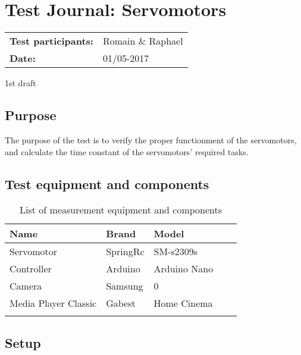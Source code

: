 \graphicspath{{figures/design/}}


			\chapter{Test Journal: Servomotors}



\begin{table}[!h]
\begin{tabular}{l l}
\textbf{Test participants:} & Romain \& Raphael   \\
\textbf{Date:}  & 01/05-2017
\end{tabular}
\end{table}

			1st draft


	\section*{Purpose}
	
The purpose of the test is to verify the proper functionment of the servomotors, and calculate the time constant of the servomotors' required tasks.




	\section*{Test equipment and components}
	
\begin{table}[h]
	\centering
	\caption{List of measurement equipment and components}\label{tab_appendix:template}

	\begin{tabularx}{\textwidth}{lXXXX}
		Name & Brand & Model 		\\ \toprule
		\rowcolor{lightGrey}
		Servomotor	& SpringRc & SM-s2309s 	\\
		Controller	& Arduino & Arduino Nano\\ 
		Camera & Samsung & 0\\
		Media Player Classic & Gabest & Home Cinema\\ \rowcolor{lightGrey}
	\end{tabularx}
\end{table}




	\section*{Setup}
	
